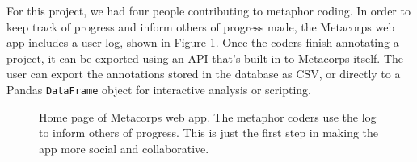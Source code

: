 For this project, we had four people contributing to metaphor coding. In order
to keep track of progress and inform others of progress made, the Metacorps
web app includes a user log, shown in Figure \ref{fig:metacorps-home}. 
Once the coders finish annotating a project, it can be exported using an API
that's built-in to Metacorps itself. The user can export the annotations stored
in the database as CSV, or directly to a Pandas \texttt{DataFrame} object
\cite{McKinney2013} for interactive analysis or scripting.

\begin{figure}
    \centering
\caption{Home page of Metacorps web app. The metaphor coders use the log to
    inform others of progress. This is just the first step in making the
    app more social and collaborative.}
\label{fig:metacorps-home}
\end{figure}


